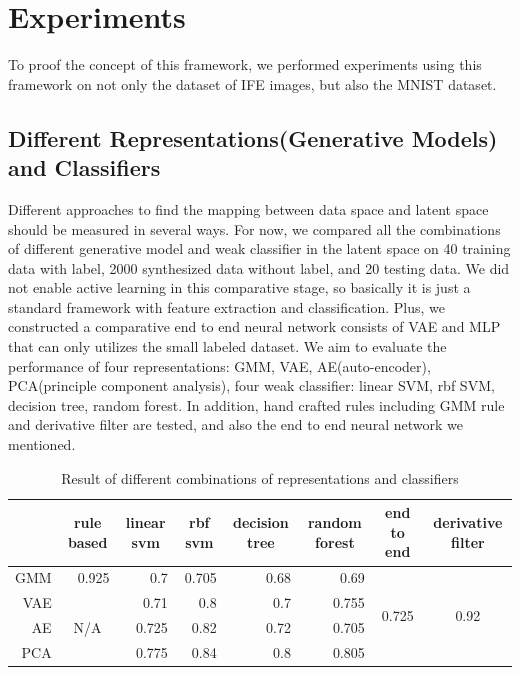 \documentclass[10pt,twocolumn,letterpaper]{article}
\begin{document}
\section{Experiments}
To proof the concept of this framework, we performed experiments using this framework on not only the dataset of IFE images, but also the MNIST dataset.
\subsection{Different Representations(Generative Models) and Classifiers}
Different approaches to find the mapping between data space and latent space should be measured in several ways. For now, we compared all the combinations of different generative model and weak classifier in the latent space on 40 training data with label, 2000 synthesized data without label, and 20 testing data. We did not enable active learning in this comparative stage, so basically it is just a standard framework with feature extraction and classification. Plus, we constructed a comparative end to end neural network consists of VAE and MLP that can only utilizes the small labeled dataset. We aim to evaluate the performance of four representations: GMM, VAE, AE(auto-encoder), PCA(principle component analysis), four weak classifier: linear SVM, rbf SVM, decision tree, random forest. In addition, hand crafted rules including GMM rule and derivative filter are tested, and also the end to end neural network we mentioned.

\begin{table}
    \centering
    \caption{Result of different combinations of representations and classifiers}
      \begin{tabular}{rcrrrrcc}
        \hline
             & rule based & \multicolumn{1}{c}{linear svm} & \multicolumn{1}{c}{rbf svm} & \multicolumn{1}{c}{decision tree} & \multicolumn{1}{c}{random forest} & \multicolumn{1}{p{6.5em}}{end to end} & derivative filter \\
            \hline
      GMM   & \multicolumn{1}{r}{0.925} & 0.7   & 0.705 & 0.68  & 0.69  & \multirow{4}[0]{*}{0.725} & \multirow{4}[0]{*}{0.92} \\
      VAE   & \multicolumn{1}{c}{\multirow{3}[0]{*}{N/A}} & 0.71  & 0.8   & 0.7   & 0.755 &       &  \\
      AE    &       & 0.725 & 0.82  & 0.72  & 0.705 &       &  \\
      PCA   &       & 0.775 & 0.84  & 0.8   & 0.805 &       &  \\
      \hline
      \end{tabular}%
    \label{tab:addlabel}%
  \end{table}
\end{document}
